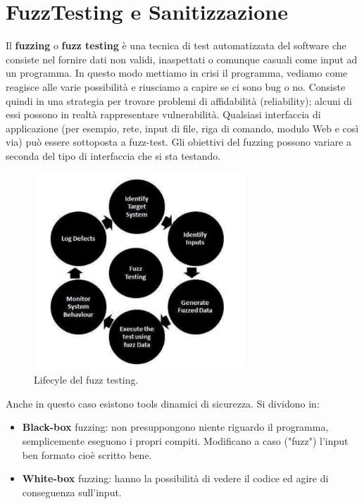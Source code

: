 \chapter{FuzzTesting e Sanitizzazione}

Il \textbf{fuzzing} o \textbf{fuzz testing} è una tecnica di test automatizzata
del software che consiste nel fornire dati non validi, inaspettati o comunque casuali
come input ad un programma. In questo modo mettiamo in crisi il programma,
vediamo come reagisce alle varie possibilità e riusciamo a capire se ci sono bug o no.
Consiste quindi in una strategia per trovare problemi di affidabilità (reliability);
alcuni di essi possono in realtà rappresentare vulnerabilità.
Qualsiasi interfaccia di applicazione (per esempio, rete, input di file, riga di comando,
modulo Web e così via) può essere sottoposta a fuzz-test.
Gli obiettivi del fuzzing possono variare a seconda del tipo di interfaccia che si sta testando.

\begin{figure}[H]
    \centering
    \includegraphics[width=8cm, keepaspectratio]{capitoli/secure_coding/img/cap_7/lifecycle.png}
    \caption{Lifecyle del fuzz testing.}
\end{figure}

Anche in questo caso esistono tools dinamici di sicurezza.
Si dividono in:

\begin{itemize}
    \item \textbf{Black-box} fuzzing: non presuppongono niente riguardo il programma,
          semplicemente eseguono i propri compiti. Modificano a caso ("fuzz") l'input ben formato
          cioè scritto bene.
    \item \textbf{White-box} fuzzing: hanno la possibilità di vedere il codice ed agire di
          conseguenza sull'input.
\end{itemize}

